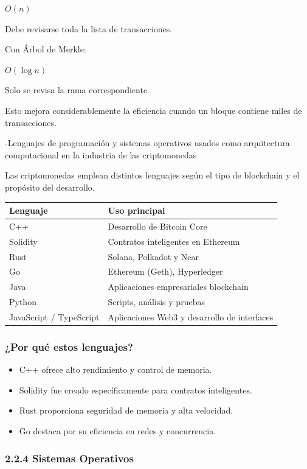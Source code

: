 \documentclass[12pt,a4paper]{article}
\begin{document}
$O(n)$

Debe revisarse toda la lista de transacciones.

Con Árbol de Merkle:

$O(\log n)$

Solo se revisa la rama correspondiente.

Esto mejora considerablemente la eficiencia cuando un bloque contiene miles de transacciones.

-Lenguajes de programación y sistemas operativos usados como arquitectura computacional en la industria de las criptomonedas

Las criptomonedas emplean distintos lenguajes según el tipo de blockchain y el propósito del desarrollo.

\begin{longtable}{ll}
\toprule
\textbf{Lenguaje} & \textbf{Uso principal} \\
\midrule
\endhead
C++ & Desarrollo de Bitcoin Core \\
Solidity & Contratos inteligentes en Ethereum \\
Rust & Solana, Polkadot y Near \\
Go & Ethereum (Geth), Hyperledger \\
Java & Aplicaciones empresariales blockchain \\
Python & Scripts, análisis y pruebas \\
JavaScript / TypeScript & Aplicaciones Web3 y desarrollo de interfaces \\
\bottomrule
\end{longtable}

\subsubsection*{¿Por qué estos lenguajes?}

\begin{itemize}
    \item C++ ofrece alto rendimiento y control de memoria.
    \item Solidity fue creado específicamente para contratos inteligentes.
    \item Rust proporciona seguridad de memoria y alta velocidad.
    \item Go destaca por su eficiencia en redes y concurrencia.
\end{itemize}

\subsubsection*{2.2.4 Sistemas Operativos}
\end{document}
